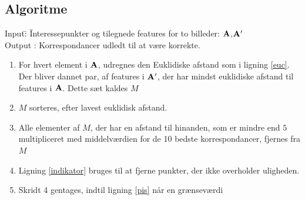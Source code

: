 \subsection*{Algoritme}
\begin{tabbing}
Input\quad \= : \= Interessepunkter og tilegnede features for to billeder: $\bold{A}$,$\bold{A'}$\\
Output \text{ } \> : \> Korrespondancer udledt til at være korrekte.
\end{tabbing}
\begin{enumerate}
\item{For hvert element i $\bold{A}$, udregnes den Euklidiske afstand som i ligning \eqref{euc}. Der bliver dannet par, af features i $\bold{A}'$, der har mindst euklidiske afstand til features i $\bold{A}$. Dette sæt kaldes $M$}
\item{$M$ sorteres, efter lavest euklidisk afstand.}
\item{Alle elementer af $M$, der har en afstand til hinanden, som er mindre end $5$ multipliceret med middelværdien for de 10 bedste korrespondancer, fjernes fra $M$}
\item{Ligning \eqref{indikator} bruges til at fjerne punkter, der ikke overholder uligheden.}
\item{Skridt 4 gentages, indtil ligning \eqref{pis} når en grænseværdi}
\end{enumerate}